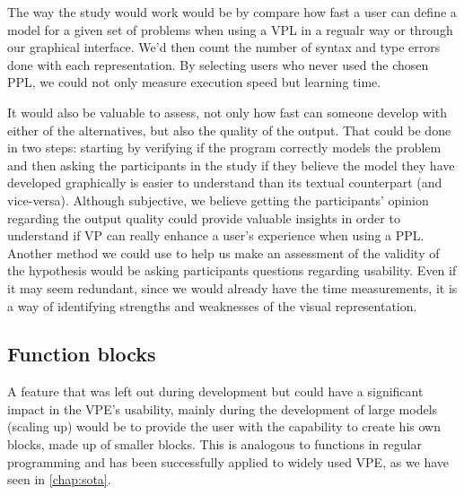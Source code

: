 The way the study would work would be by compare how fast a user can define a model for a given set of problems
when using a VPL in a regualr way or through our graphical interface. We'd then
count the number of syntax and type errors done with each representation. By
selecting users who never used the chosen PPL, we could not only measure execution
speed but learning time.

It would also be valuable to assess, not only how fast can someone develop with either
of the alternatives, but also the quality of the output. That could be done in two
steps: starting by verifying if the program correctly models the problem and then
asking the participants in the study if they believe the model they
have developed graphically is easier to understand than its textual counterpart (and
vice-versa).
Although subjective, we believe getting the participants' opinion
regarding the output quality could provide valuable insights in order to understand if VP can
really enhance a user's experience when using a PPL. Another method we could use
to help us make an assessment of the validity of the hypothesis would be asking
participants questions regarding usability. Even if it may seem redundant, since
we would already have the time measurements, it is a way of identifying strengths and
weaknesses of the visual representation.

\subsection{Function blocks}

A feature that was left out during development but could have a significant
impact in the VPE's usability, mainly during the development of large models
(scaling up) would be to provide the user with the capability to create his own
blocks, made up of smaller blocks. This is analogous to functions in regular
programming and has been successfully applied to widely used VPE, as we have
seen in \ref{chap:sota}.
